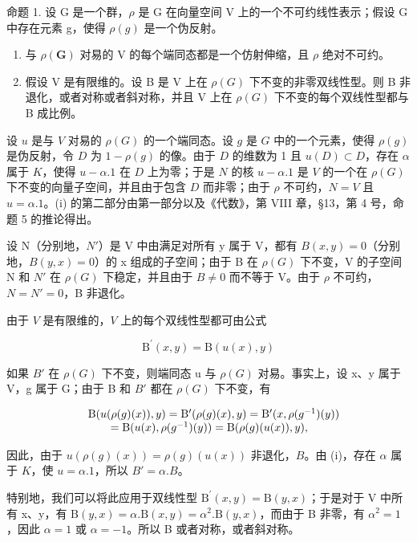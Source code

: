 命题 1. 设 G 是一个群，\(\rho\) 是 G 在向量空间 V 上的一个不可约线性表示；假设 G 中存在元素 g，使得 \(\rho(g)\) 是一个伪反射。

\begin{enumerate}
\def\labelenumi{(\roman{enumi})}
\item
与 \(\rho(\mathbf{G})\) 对易的 V 的每个端同态都是一个仿射伸缩，且 \(\rho\) 绝对不可约。
\item
  假设 V 是有限维的。设 B 是 V 上在 \(\rho(G)\) 下不变的非零双线性型。则 B 非退化，或者对称或者斜对称，并且 V 上在 \(\rho(G)\) 下不变的每个双线性型都与 B 成比例。
\end{enumerate}

设 \(u\) 是与 \(V\) 对易的 \(\rho(G)\) 的一个端同态。设 \(g\) 是 \(G\) 中的一个元素，使得 \(\rho(g)\) 是伪反射，令 \(D\) 为 \(1 - \rho(g)\) 的像。由于 \(D\) 的维数为 1 且 \(u(D) \subset D\)，存在 \(\alpha\) 属于 \(K\)，使得 \(u - \alpha.1\) 在 \(D\) 上为零；于是 \(N\) 的核 \(u - \alpha.1\) 是 \(V\) 的一个在 \(\rho(G)\) 下不变的向量子空间，并且由于包含 \(D\) 而非零；由于 \(\rho\) 不可约，\(N = V\) 且 \(u = \alpha.1\)。(i) 的第二部分由第一部分以及《代数》，第 VIII 章，§13，第 4 号，命题 5 的推论得出。

设 N（分别地，\(N'\)）是 V 中由满足对所有 y 属于 V，都有 \(B(x,y)=0\)（分别地，\(B(y,x)=0\)）的 x 组成的子空间；由于 B 在 \(\rho(G)\) 下不变，V 的子空间 N 和 \(N'\) 在 \(\rho(G)\) 下稳定，并且由于 \(B\neq0\) 而不等于 V。由于 \(\rho\) 不可约，\(N=N'=0\)，B 非退化。

由于 \(V\) 是有限维的，\(V\) 上的每个双线性型都可由公式

\[
\mathrm{B} ^ {\prime} (x, y) = \mathrm{B} (u (x), y)\tag{3}
\]

如果 \(B'\) 在 \(\rho(G)\) 下不变，则端同态 u 与 \(\rho(G)\) 对易。事实上，设 x、y 属于 V，g 属于 G；由于 B 和 \(B'\) 都在 \(\rho(G)\) 下不变，有

\[
\begin{array}{r l} & {\mathrm{B} (u (\rho (g) (x)), y) = \mathrm{B} ^ {\prime} (\rho (g) (x), y) = \mathrm{B} ^ {\prime} (x, \rho (g ^ {- 1}) (y))} \\ & {\qquad = \mathrm{B} (u (x), \rho (g ^ {- 1}) (y)) = \mathrm{B} (\rho (g) (u (x)), y),} \end{array}
\]

因此，由于 \(u(\rho(g)(x)) = \rho(g)(u(x))\) 非退化，\(B\)。由 (i)，存在 \(\alpha\) 属于 \(K\)，使 \(u = \alpha.1\)，所以 \(B' = \alpha.B\)。

特别地，我们可以将此应用于双线性型 \(\mathrm{B}^{\prime}(x,y)=\mathrm{B}(y,x)\)；于是对于 V 中所有 x、y，有 \(\mathrm{B}(y,x)=\alpha.\mathrm{B}(x,y)=\alpha^{2}.\mathrm{B}(y,x)\)，而由于 B 非零，有 \(\alpha^{2}=1\)，因此 \(\alpha=1\) 或 \(\alpha=-1\)。所以 B 或者对称，或者斜对称。

